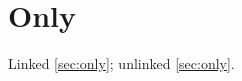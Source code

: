 \documentclass{article}
\begin{document}
\section{Only}\label{sec:only}
Linked \autoref{sec:only}; unlinked \autoref*{sec:only}.
\end{document}
